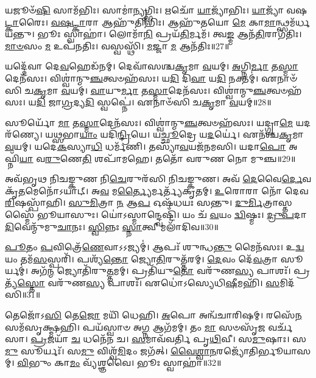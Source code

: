 𑌯𑌜𑍂𑍞᳴\-\ul{𑌷𑌿} 𑌸𑌾𑌮᳴𑌭𑌿𑌃।
𑌸𑌾𑌮𑌾॑\-\ul{𑌨𑍍𑌯𑍃}\-𑌗𑍍𑌭𑌿𑌃।
𑌋𑌚𑍋᳴ \ul{𑌯𑌾}\-𑌜𑍍𑌯𑌾᳴𑌭𑌿𑌃।
\-\ul{𑌯𑌾}\-𑌜𑍍𑌯𑌾᳴ 𑌵𑌷\-\ul{𑌟𑍍𑌕𑌾}\-𑌰𑍈𑌃।
\-\ul{𑌵}\-\-\ul{𑌷}\-\-\ul{𑌟𑍍𑌕𑌾}\-𑌰𑌾 𑌆𑌹𑍁᳴𑌤𑌿𑌭𑌿𑌃।
𑌆𑌹𑍁᳴𑌤𑌯𑍋 \ul{𑌮𑍇} 𑌕𑌾\-\ul{𑌮𑌾}\-𑌨𑍍𑌥𑍍𑌸𑌮᳴𑌰𑍍𑌧𑌯𑌨𑍍𑌤𑍁।
𑌭𑍂𑌃 𑌸𑍍𑌵𑌾𑌹𑌾॑।
𑌲𑍋𑌮𑌾᳴\-\ul{𑌨𑌿} 𑌪𑍍𑌰𑌯᳴\-\ul{𑌤𑌿}\-𑌰𑍍𑌮𑌮᳴।
𑌤𑍍𑌵\-\ul{𑌙𑍍𑌮} 𑌆𑌨᳴\-\ul{𑌤𑌿}\-𑌰𑌾𑌗᳴𑌤𑌿𑌃।
\-\ul{𑌮𑌾}\-\-\ul{𑍞}\-𑌸𑌂 \ul{𑌮} 𑌉𑌪᳴𑌨𑌤𑌿𑌃।
𑌵𑌸𑍍𑌵𑌸𑍍𑌥𑌿᳴।
\-\ul{𑌮}\-𑌜𑍍𑌜𑌾 \ul{𑌮} 𑌆𑌨᳴𑌤𑌿𑌃॥27॥\anuvakamend[\-\ul{𑌪}\-𑌸𑍍𑌤𑍍𑌯𑌾॑𑌸𑍍𑌵𑌾 𑌸𑌰᳴𑌸𑍍𑌵\-\ul{𑌤𑍍𑌯𑍈} 𑌭𑍈𑌷᳴𑌜𑍍𑌯𑍇\-\ul{𑌨} 𑌶𑍍𑌰𑍀𑌰𑌙𑍍𑌗𑌾᳴𑌨𑌿 \ul{𑌭}\-𑌸\-\ul{𑌦𑍍𑌯}\-𑌜𑍍𑌞𑍇 \ul{𑌯}\-𑌜𑍍𑌞𑍋 𑌯𑌜𑍁᳴\-\ul{𑌰𑍍𑌭𑌿}\-𑌰𑍁𑌪᳴𑌨\-\ul{𑌤𑌿}\-𑌰𑍍𑌦𑍍𑌵𑍇 𑌚᳴]

𑌯𑌦𑍍𑌦𑍇᳴𑌵𑌾 𑌦𑍇\-\ul{𑌵}\-𑌹𑍇𑌡᳴𑌨𑌮𑍍।
𑌦𑍇𑌵𑌾᳴𑌸𑌶𑍍𑌚\-\ul{𑌕𑍃}\-𑌮𑌾 \ul{𑌵}\-𑌯𑌮𑍍।
\-\ul{𑌅}\-𑌗𑍍𑌨𑌿\-\ul{𑌰𑍍𑌮𑌾} 𑌤\-\ul{𑌸𑍍𑌮𑌾}\-𑌦𑍇𑌨᳴𑌸𑌃।
𑌵𑌿𑌶𑍍𑌵𑌾॑𑌨𑍍𑌮𑍁\-\ul{𑌞𑍍𑌚}\-𑌤𑍍𑌵𑍞𑌹᳴𑌸𑌃।
𑌯\-\ul{𑌦𑌿} 𑌦𑌿\-\ul{𑌵𑌾} 𑌯\-\ul{𑌦𑌿} 𑌨𑌕𑍍𑌤𑌮𑍍॑।
𑌏𑌨𑌾𑍞᳴𑌸𑌿 𑌚\-\ul{𑌕𑍃}\-𑌮𑌾 \ul{𑌵}\-𑌯𑌮𑍍।
\-\ul{𑌵𑌾}\-𑌯𑍁\-\ul{𑌰𑍍𑌮𑌾} 𑌤\-\ul{𑌸𑍍𑌮𑌾}\-𑌦𑍇𑌨᳴𑌸𑌃।
𑌵𑌿𑌶𑍍𑌵𑌾॑𑌨𑍍𑌮𑍁\-\ul{𑌞𑍍𑌚}\-𑌤𑍍𑌵𑍞𑌹᳴𑌸𑌃।
𑌯\-\ul{𑌦𑌿} 𑌜𑌾\-\ul{𑌗𑍍𑌰}\-𑌦𑍍𑌯\-\ul{𑌦𑌿} 𑌸𑍍𑌵𑌪𑍍𑌨𑍇॑।
𑌏𑌨𑌾𑍞᳴𑌸𑌿 𑌚\-\ul{𑌕𑍃}\-𑌮𑌾 \ul{𑌵}\-𑌯𑌮𑍍॥28॥

𑌸𑍂𑌰𑍍𑌯𑍋᳴ \ul{𑌮𑌾} 𑌤\-\ul{𑌸𑍍𑌮𑌾}\-𑌦𑍇𑌨᳴𑌸𑌃।
𑌵𑌿𑌶𑍍𑌵𑌾॑𑌨𑍍𑌮𑍁\-\ul{𑌞𑍍𑌚}\-𑌤𑍍𑌵𑍞𑌹᳴𑌸𑌃।
𑌯𑌦𑍍𑌗𑍍𑌰𑌾\-\ul{𑌮𑍇} 𑌯𑌦𑌰᳴𑌣𑍍𑌯𑍇।
𑌯\-\ul{𑌥𑍍𑌸}\-𑌭𑌾\-\ul{𑌯𑌾𑌂} 𑌯𑌦𑌿᳴\-\ul{𑌨𑍍𑌦𑍍𑌰𑌿}\-𑌯𑍇।
𑌯\-\ul{𑌚𑍍𑌛𑍂}\-𑌦𑍍𑌰𑍇 𑌯\-\ul{𑌦}\-𑌰𑍍𑌯𑍇॑।
𑌏𑌨᳴𑌶𑍍𑌚\-\ul{𑌕𑍃}\-𑌮𑌾 \ul{𑌵}\-𑌯𑌮𑍍।
𑌯𑌦𑍇\-\ul{𑌕}\-𑌸𑍍𑌯𑌾\-\ul{𑌧𑌿} 𑌧𑌰𑍍𑌮᳴𑌣𑌿।
𑌤𑌸𑍍𑌯𑌾᳴\-\ul{𑌵}\-𑌯𑌜᳴𑌨𑌮𑌸𑌿।
𑌯𑌦𑌾\-\ul{𑌪𑍋} 𑌅𑌘𑍍𑌨𑌿᳴\-\ul{𑌯𑌾} 𑌵\-\ul{𑌰𑍁}\-𑌣𑍇\-\ul{𑌤𑌿} 𑌶𑌪𑌾᳴𑌮𑌹𑍇।
𑌤𑌤𑍋᳴ 𑌵𑌰𑍁𑌣 𑌨𑍋 𑌮𑍁𑌞𑍍𑌚॥29॥

𑌅𑌵᳴𑌭𑍃𑌥 𑌨𑌿𑌚𑌙𑍍𑌕𑍁𑌣 𑌨𑌿\-\ul{𑌚𑍇}\-𑌰𑍁𑌰᳴𑌸𑌿 𑌨𑌿𑌚𑌙𑍍𑌕𑍁𑌣।
𑌅𑌵᳴ \ul{𑌦𑍇}\-𑌵𑍈\-\ul{𑌰𑍍𑌦𑍇}\-𑌵𑌕𑍃᳴\-\ul{𑌤}\-𑌮𑍇𑌨𑍋᳴\-𑌽𑌯𑌾𑌟𑍍।
𑌅\-\ul{𑌵} 𑌮\-\ul{𑌰𑍍𑌤𑍍𑌯𑍈}\-𑌰𑍍𑌮𑌰𑍍𑌤𑍍𑌯᳴𑌕𑍃𑌤𑌮𑍍।
\-\ul{𑌉}\-𑌰𑍋𑌰𑌾 𑌨𑍋᳴ 𑌦𑍇𑌵 \ul{𑌰𑌿}\-𑌷𑌸𑍍𑌪𑌾᳴𑌹𑌿।
\-\ul{𑌸𑍁}\-\-\ul{𑌮𑌿}\-𑌤𑍍𑌰𑌾 \ul{𑌨} 𑌆\-\ul{𑌪} 𑌓𑌷᳴𑌧𑌯𑌃 𑌸𑌨𑍍𑌤𑍁।
\-\ul{𑌦𑍁}\-\-\ul{𑌰𑍍𑌮𑌿}\-𑌤𑍍𑌰𑌾𑌸𑍍𑌤𑌸𑍍𑌮𑍈᳴ 𑌭𑍂𑌯𑌾𑌸𑍁𑌃।
𑌯𑍋॑𑌽𑌸𑍍𑌮𑌾𑌨𑍍𑌦𑍍𑌵𑍇𑌷𑍍𑌟𑌿᳴।
𑌯𑌂 𑌚᳴ \ul{𑌵}\-𑌯𑌂 \ul{𑌦𑍍𑌵𑌿}\-𑌷𑍍𑌮𑌃।
\-\ul{𑌦𑍍𑌰𑍁}\-\-\ul{𑌪}\-𑌦𑌾\-\ul{𑌦𑌿}\-𑌵𑍇𑌨𑍍𑌮𑍁᳴𑌮𑍁\-\ul{𑌚𑌾}\-𑌨𑌃।
\-\ul{𑌸𑍍𑌵𑌿}\-𑌨𑍍𑌨𑌃 \ul{𑌸𑍍𑌨𑌾}\-𑌤𑍍𑌵𑍀 𑌮𑌲𑌾᳴𑌦𑌿𑌵॥30॥

\-\ul{𑌪𑍂}\-𑌤𑌂 \ul{𑌪}\-𑌵𑌿𑌤𑍍𑌰𑍇᳴\-\ul{𑌣𑍇}\-𑌵𑌾𑌽𑌽𑌜𑍍𑌯𑌮𑍍॑।
𑌆𑌪𑌃᳴ 𑌶𑍁𑌨𑍍𑌧\-\ul{𑌨𑍍𑌤𑍁} 𑌮𑍈𑌨᳴𑌸𑌃।
𑌉\-\ul{𑌦𑍍𑌵}\-𑌯𑌂 𑌤𑌮᳴\-\ul{𑌸}\-𑌸𑍍𑌪𑌰𑌿᳴।
𑌪𑌶𑍍𑌯᳴\-\ul{𑌨𑍍𑌤𑍋} 𑌜𑍍𑌯𑍋\-\ul{𑌤𑌿}\-𑌰𑍁𑌤𑍍𑌤᳴𑌰𑌮𑍍।
\-\ul{𑌦𑍇}\-𑌵𑌂 𑌦𑍇᳴\-\ul{𑌵}\-𑌤𑍍𑌰𑌾 𑌸𑍂𑌰𑍍𑌯𑌮𑍍॑।
𑌅𑌗᳴\-\ul{𑌨𑍍𑌮} 𑌜𑍍𑌯𑍋𑌤𑌿᳴𑌰𑍁\-\ul{𑌤𑍍𑌤}\-𑌮𑌮𑍍।
𑌪𑍍𑌰𑌤𑌿᳴\-𑌯𑍁\-\ul{𑌤𑍋} 𑌵𑌰𑍁᳴𑌣\-\ul{𑌸𑍍𑌯} 𑌪𑌾𑌶𑌃᳴।
𑌪𑍍𑌰𑌤𑍍𑌯᳴\-\ul{𑌸𑍍𑌤𑍋} 𑌵𑌰𑍁᳴𑌣\-\ul{𑌸𑍍𑌯} 𑌪𑌾𑌶𑌃᳴।
𑌏𑌧𑍋॑𑌽𑌸𑍍𑌯𑍇𑌧𑌿\-\ul{𑌷𑍀}\-𑌮𑌹𑌿᳴।
\-\ul{𑌸}\-𑌮𑌿𑌦᳴𑌸𑌿॥31॥

𑌤𑍇𑌜𑍋᳴𑌽\-\ul{𑌸𑌿} 𑌤𑍇\-\ul{𑌜𑍋} 𑌮𑌯𑌿᳴ 𑌧𑍇𑌹𑌿।
\-\ul{𑌅}\-𑌪𑍋 𑌅𑌨𑍍𑌵᳴𑌚𑌾𑌰𑌿𑌷𑌮𑍍।
𑌰𑌸𑍇᳴\-\ul{𑌨} 𑌸𑌮᳴𑌸𑍃𑌕𑍍𑌷𑍍𑌮𑌹𑌿।
𑌪𑌯᳴𑌸𑍍𑌵𑌾𑍞 𑌅\-\ul{𑌗𑍍𑌨} 𑌆𑌗᳴𑌮𑌮𑍍।
𑌤𑌂 \ul{𑌮𑌾} 𑌸𑍞𑌸𑍃᳴\-\ul{𑌜} 𑌵𑌰𑍍𑌚᳴𑌸𑌾।
\-\ul{𑌪𑍍𑌰}\-𑌜𑌯𑌾᳴ \ul{𑌚} 𑌧𑌨𑍇᳴𑌨 𑌚।
\-\ul{𑌸}\-𑌮𑌾𑌵᳴𑌵𑌰𑍍𑌤𑌿 𑌪𑍃\-\ul{𑌥𑌿}\-𑌵𑍀।
𑌸\-\ul{𑌮𑍁}\-𑌷𑌾𑌃।
𑌸\-\ul{𑌮𑍁} 𑌸𑍂𑌰𑍍𑌯𑌃᳴।
𑌸\-\ul{𑌮𑍁} 𑌵𑌿𑌶𑍍𑌵᳴\-\ul{𑌮𑌿}\-𑌦𑌂 𑌜𑌗᳴𑌤𑍍।
\-\ul{𑌵𑍈}\-\-\ul{𑌶𑍍𑌵𑌾}\-\-\ul{𑌨}\-𑌰𑌜𑍍𑌯𑍋᳴𑌤𑌿𑌰𑍍𑌭𑍂𑌯𑌾𑌸𑌮𑍍।
\-\ul{𑌵𑌿}\-𑌭𑍁𑌂 𑌕𑌾\-\ul{𑌮𑌂} 𑌵𑍍𑌯᳴𑌶𑍍𑌞𑌵𑍈।
𑌭𑍂𑌃 𑌸𑍍𑌵𑌾𑌹𑌾॑॥32॥\anuvakamend[𑌸𑍍𑌵\-\ul{𑌪𑍍𑌨} 𑌏𑌨𑌾𑍞᳴𑌸𑌿 𑌚\-\ul{𑌕𑍃}\-𑌮𑌾 \ul{𑌵}\-𑌯𑌂 𑌮𑍁᳴\-\ul{𑌞𑍍𑌚} 𑌮𑌲𑌾᳴𑌦𑌿𑌵 \ul{𑌸}\-𑌮𑌿𑌦᳴\-\ul{𑌸𑌿} 𑌜\-\ul{𑌗}\-𑌤𑍍𑌰𑍀𑌣𑌿᳴ 𑌚]

